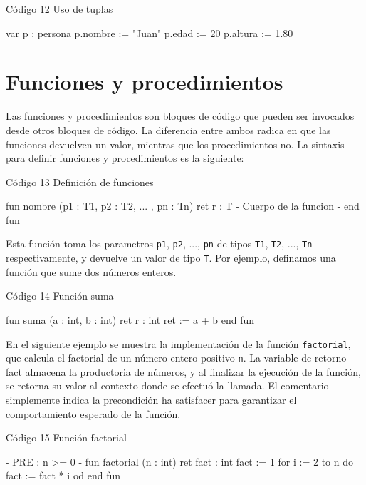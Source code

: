 \begin{codebox}{Código 12}
\footnotesize Uso de tuplas
\tcblower
\begin{pascallike}
var p : persona
p.nombre := "Juan"
p.edad := 20
p.altura := 1.80
\end{pascallike}
\end{codebox}

\section{Funciones y procedimientos}
Las funciones y procedimientos son bloques de código que pueden ser invocados desde otros bloques de código. La diferencia entre ambos radica en que las funciones devuelven un valor, mientras que los procedimientos no. La sintaxis para definir funciones y procedimientos es la siguiente:

\begin{codebox}{Código 13}
\footnotesize Definición de funciones 
\tcblower
\begin{pascallike}
fun nombre (p1 : T1, p2 : T2, ... , pn : Tn) ret r : T
    {- Cuerpo de la funcion -}
end fun 
\end{pascallike}
\end{codebox}
Esta función toma los parametros \texttt{p1}, \texttt{p2}, ..., \texttt{pn} de tipos \texttt{T1}, \texttt{T2}, ..., \texttt{Tn} respectivamente, y devuelve un valor de tipo \texttt{T}. Por ejemplo, definamos una función que sume dos números enteros.

\begin{codebox}{Código 14}
\footnotesize Función suma
\tcblower
\begin{pascallike}
fun suma (a : int, b : int) ret r : int
    ret := a + b
end fun
\end{pascallike}
\end{codebox}

En el siguiente ejemplo se muestra la implementación de la función \texttt{factorial}, que calcula el factorial de un número entero positivo \texttt{n}. La variable de retorno fact almacena la productoria de números, y al finalizar la ejecución de la función, se retorna su valor al contexto donde se efectuó la llamada. El comentario simplemente indica la precondición ha satisfacer para garantizar el comportamiento esperado de la función.

\begin{codebox}{Código 15}
\footnotesize Función factorial
\tcblower
\begin{pascallike}
{- PRE : n >= 0 -}
fun factorial (n : int) ret fact : int
    fact := 1
    for i := 2 to n do
        fact := fact * i
    od
end fun
\end{pascallike}
\end{codebox}

